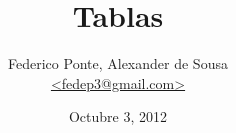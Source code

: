 \documentclass[11pt,fleqn]{article}
\begin{document}
\title{Tablas}
\author{Federico Ponte, Alexander de Sousa\\
\href{mailto:fedep3@gmail.com}{<fedep3@gmail.com>}}

\date{Octubre 3, 2012}
\maketitle
























\end{document}
